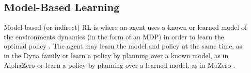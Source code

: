 \subsection{Model-Based Learning}
Model-based (or indirect) RL is where an agent uses a known or learned model of the environments dynamics (in the form of an MDP) in order to learn the optimal policy \cite{MAL-086}. The agent may learn the model and policy at the same time, as in the Dyna family \cite{Sutton:1990, 10.1145/122344.122377} or learn a policy by planning over a known model, as in AlphaZero \cite{DBLP:journals/corr/abs-1712-01815} or learn a policy by planning over a learned model, as in MuZero \cite{DBLP:journals/corr/abs-1911-08265}.
